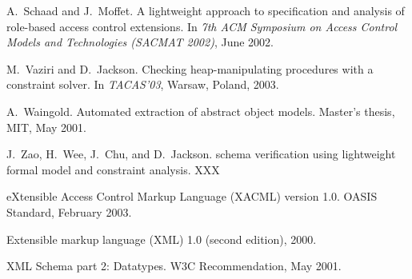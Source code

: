 \documentclass{acm_proc_article-sp}
\begin{document}
\begin{thebibliography}{10}
A.~Schaad and J.~Moffet.
\newblock A lightweight approach to specification and analysis of role-based access control extensions.
\newblock In {\em 7th ACM Symposium on Access Control Models and Technologies (SACMAT 2002)}, June 2002.

M.~Vaziri and D.~Jackson.
\newblock Checking heap-manipulating procedures with a constraint solver.
\newblock In {\em TACAS'03}, Warsaw, Poland, 2003.

A.~Waingold.
\newblock Automated extraction of abstract object models.
\newblock Master's thesis, MIT, May 2001.

J.~Zao, H.~Wee, J.~Chu, and D.~Jackson.
 schema verification using lightweight formal model and constraint analysis.
\newblock XXX

{eXtensible Access Control Markup Language (XACML)} version 1.0.
\newblock OASIS Standard, February 2003.

Extensible markup language ({XML}) 1.0 (second edition), 2000.

{XML Schema} part 2: Datatypes.
\newblock W3C Recommendation, May 2001.

\end{thebibliography}


% 

% 
% 
\end{document}
